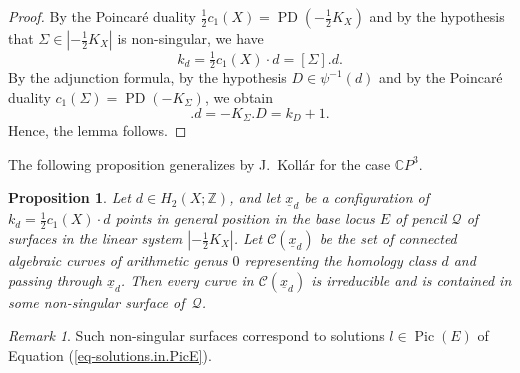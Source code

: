 \documentclass[11pt]{amsart}
\numberwithin{equation}{section}
\theoremstyle{definition}
\theoremstyle{plain}
\newtheorem{proposition}[definition]{Proposition}
\theoremstyle{remark}
\newtheorem{remark}[definition]{Remark}
\newcommand{\Z}{\mathbb{Z}}
\newcommand{\cpp}{\mathbb{C}P^3}
\DeclareMathOperator{\Pic}{Pic}
\newcommand{\PD}{\operatorname{PD}}
\begin{document}
 \begin{proof}
   By the Poincar\'e duality $\tfrac{1}{2}c_1(X)=\PD(-\tfrac{1}{2}K_X)$ and by the hypothesis that $\Sigma\in |-\tfrac{1}{2}K_X|$ is non-singular, we have
   $$k_d=\tfrac{1}{2}c_1(X)\cdot d=[\Sigma]. d .$$
By the adjunction formula, by the hypothesis $D\in \psi^{-1}(d)$ 
and by the Poincar\'e duality $c_1(\Sigma) =\PD(-K_\Sigma)$, we obtain
\begin{equation*}
[\Sigma].d=-K_\Sigma.D=k_D+1.
\end{equation*}
Hence, the lemma follows. 
\end{proof}

  The following proposition generalizes \cite[Proposition 3]{kollar2015examples} by J.~Koll\'ar for the case $\cpp$.

\begin{proposition} \label{Prop-Kollar}
Let $d\in H_2(X;\Z)$, and let  $\underline{x}_d$ be a configuration of\, $k_d=\tfrac{1}{2}c_1(X)\cdot d$ points in general position in the base locus $E$ of pencil $\mathcal{Q}$ of surfaces in the linear system $|-\frac{1}{2}K_X|$. Let $\mathcal{C}(\underline{x}_d)$ be the set of \textit{connected algebraic curves of arithmetic genus $0$ representing the homology class $d$ and passing through $\underline{x}_d$}. Then every curve in $\mathcal{C}(\underline{x}_d)$ is irreducible and is contained in some non-singular surface of\,  $\mathcal{Q}$.
 \end{proposition}
 
 \begin{remark}
     Such non-singular surfaces correspond to solutions $l\in \Pic(E)$ of Equation (\ref{eq-solutions.in.PicE}).
 \end{remark}
\end{document}
